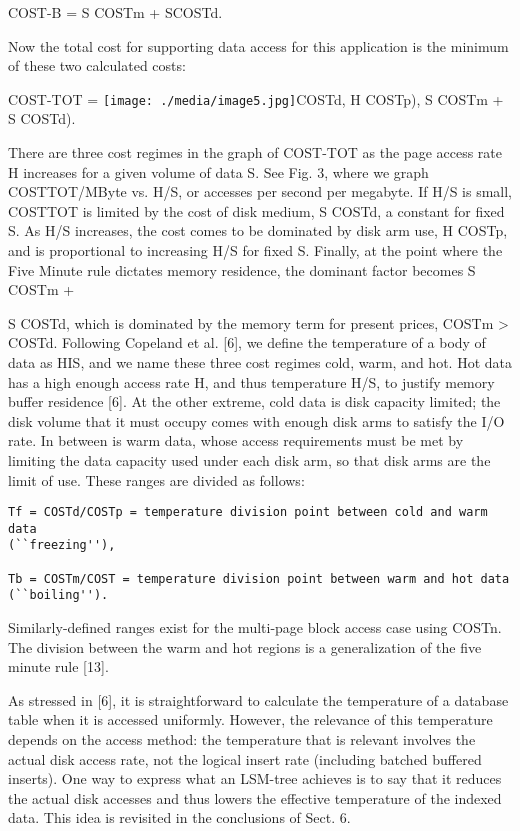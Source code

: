 \documentclass[a4paper,12pt,notitlepage,twoside,openright]{article}
\begin{document}
COST-B = S COSTm + SCOSTd.

Now the total cost for supporting data access for this application is
the minimum of these two calculated costs:

COST-TOT =
\texttt{[image: ./media/image5.jpg]}COSTd,
H COSTp), S COSTm + S COSTd).

There are three cost regimes in the graph of COST-TOT as the page access
rate H increases for a given volume of data S. See Fig. 3, where we
graph COSTTOT/MByte vs. H/S, or accesses per second per megabyte. If H/S
is small, COSTTOT is limited by the cost of disk medium, S COSTd, a
constant for fixed S. As H/S increases, the cost comes to be dominated
by disk arm use, H COSTp, and is proportional to increasing H/S for
fixed S. Finally, at the point where the Five Minute rule dictates
memory residence, the dominant factor becomes S COSTm +

S COSTd, which is dominated by the memory term for present prices, COSTm
\textgreater{} COSTd. Following Copeland et al. {[}6{]}, we define the
temperature of a body of data as HIS, and we name these three cost
regimes cold, warm, and hot. Hot data has a high enough access rate H,
and thus temperature H/S, to justify memory buffer residence {[}6{]}. At
the other extreme, cold data is disk capacity limited; the disk volume
that it must occupy comes with enough disk arms to satisfy the I/O rate.
In between is warm data, whose access requirements must be met by
limiting the data capacity used under each disk arm, so that disk arms
are the limit of use. These ranges are divided as follows:

\begin{verbatim}
Tf = COSTd/COSTp = temperature division point between cold and warm data
(``freezing''),

Tb = COSTm/COST = temperature division point between warm and hot data
(``boiling'').
\end{verbatim}

Similarly-defined ranges exist for the multi-page block access case
using COSTn. The division between the warm and hot regions is a
generalization of the five minute rule {[}13{]}.

As stressed in {[}6{]}, it is straightforward to calculate the
temperature of a database table when it is accessed uniformly. However,
the relevance of this temperature depends on the access method: the
temperature that is relevant involves the actual disk access rate, not
the logical insert rate (including batched buffered inserts). One way to
express what an LSM-tree achieves is to say that it reduces the actual
disk accesses and thus lowers the effective temperature of the indexed
data. This idea is revisited in the conclusions of Sect. 6.
\end{document}
